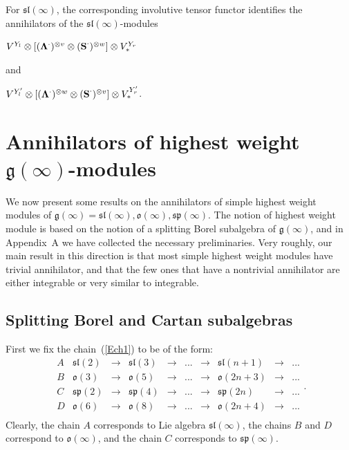 \documentclass{emsprocart}
\begin{document}
For $\mathfrak{sl}(\infty)$, the corresponding involutive tensor functor identifies the annihilators of the $\mathfrak{sl}(\infty)$-modules
\begin{center}$V^{Y_l}\otimes[({\bf \Lambda}^\cdot)^{\otimes v}\otimes(\operatorname{\bf S}^\cdot)^{\otimes w}]\otimes V^{Y_r}_*$\end{center}and\begin{center}
$V^{Y_l'}\otimes[({\bf \Lambda}^\cdot)^{\otimes w}\otimes(\operatorname{\bf S}^\cdot)^{\otimes v}]\otimes V^{Y_r'}_*$.\end{center}



\section{Annihilators of highest weight $\mathfrak g(\infty)$-modules}\label{Sann}
We now present some results on the annihilators of simple highest weight modules of $\mathfrak g(\infty)=\mathfrak{sl}(\infty), \mathfrak o(\infty), \mathfrak{sp}(\infty)$. The notion of highest weight module is based on the notion of a splitting Borel subalgebra of $\mathfrak g(\infty)$, and in Appendix~A we have collected the necessary preliminaries. Very roughly, our main result in this direction is that most simple highest weight modules have trivial annihilator, and that the few ones that have a nontrivial annihilator are either integrable or very similar to integrable.

\subsection{Splitting Borel and Cartan subalgebras}\label{SSspl} First we fix the chain~(\ref{Ech1}) to be of the form:
$$\begin{array}{c|ccccccccc}A&\mathfrak{sl}(2)&\to&\mathfrak{sl}(3)&\to&...&\to&\mathfrak{sl}(n+1)&\to&...\\
B&\mathfrak o(3)&\to&\mathfrak o(5)&\to&...&\to&\mathfrak o(2n+3)&\to&...\\
C&\mathfrak{sp}(2)&\to&\mathfrak{sp}(4)&\to&...&\to&\mathfrak{sp}(2n)&\to&...\\
D&\mathfrak o(6)&\to&\mathfrak o(8)&\to&...&\to&\mathfrak o(2n+4)&\to&...\\
\end{array}.$$
Clearly, the chain $A$ corresponds to Lie algebra $\mathfrak{sl}(\infty)$, the chains $B$ and $D$ correspond to $\mathfrak o(\infty)$, and the chain $C$ corresponds to $\mathfrak{sp}(\infty)$.
\end{document}
